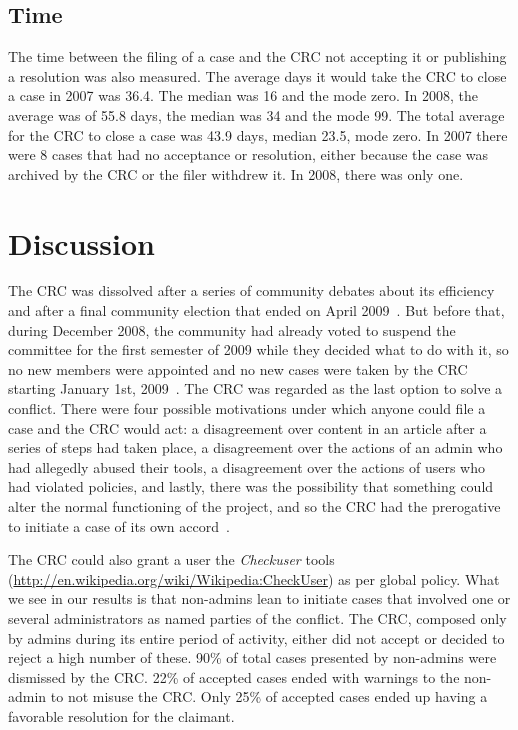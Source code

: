 \documentclass{sigchi}
\begin{document}
\subsection{Time}
The time between the filing of a case and the CRC not accepting it or publishing a resolution 
was also measured. The average days it would take the CRC to close a case in 2007 was 36.4. 
The median was 16 and the mode zero. In 2008, the average was of 55.8 days, the median was 34 
and the mode 99. The total average for the CRC to close a case was 43.9 days, median 23.5, 
mode zero. In 2007 there were 8 cases that had no acceptance or resolution, either because 
the case was archived by the CRC or the filer withdrew it. In 2008, there was only one.

\section{Discussion}

The CRC was dissolved after a series of community debates about its efficiency and after a 
final community election that ended on April 2009~\cite{wiki:disolCRC}. But before that, during December 2008, 
the community had already voted to suspend the committee for the first semester of 2009 while 
they decided what to do with it, so no new members were appointed and no new cases were taken 
by the CRC starting January 1st, 2009~\cite{wiki:suspenCRC}.
The CRC was regarded as the last option to solve a conflict. There were four possible motivations
under which anyone could file a case and the CRC would act: a disagreement over content in an
article after a series of steps had taken place, a disagreement over the actions of an admin who
had allegedly abused their tools, a disagreement over the actions of users who had violated
policies, and lastly, there was the possibility that something could alter the normal functioning
of the project, and so the CRC had the prerogative to initiate a case of its own 
accord~\cite{wiki:motivacion}.

The CRC could also grant a user the \textit{Checkuser} tools (\url{http://en.wikipedia.org/wiki/Wikipedia:CheckUser}) as per global policy. 
What we see in our results is that non-admins lean to initiate cases that involved one or
several administrators as named parties of the conflict. The CRC, composed only by admins during
its entire period of activity, either did not accept or decided to reject a high number of these.
90\% of total cases presented by non-admins were dismissed by the CRC. 22\% of accepted cases
ended with warnings to the non-admin to not misuse the CRC. Only 25\% of accepted cases ended up
having a favorable resolution for the claimant. 
\end{document}
